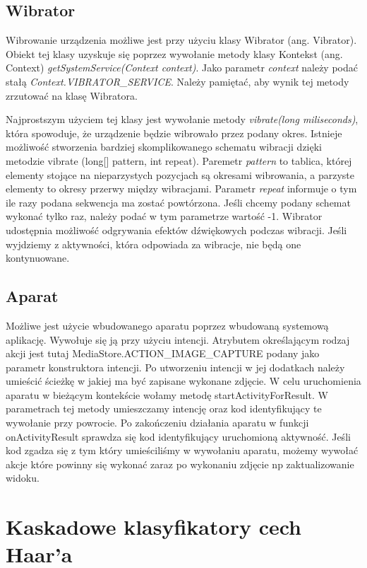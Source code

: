 \documentclass{article}
\let\stdsection\section
\renewcommand\section{\newpage\stdsection}
\numberwithin{equation}{section}
\begin{document}
\subsection{Wibrator}
Wibrowanie urządzenia możliwe jest przy użyciu klasy Wibrator (ang. Vibrator). Obiekt tej klasy uzyskuje się poprzez wywołanie metody klasy Kontekst (ang. Context) \textit{getSystemService(Context context)}. Jako parametr \textit{context} należy podać stałą \textit{Context.VIBRATOR\_SERVICE}. Należy pamiętać, aby wynik tej metody zrzutować na klasę Wibratora.\par Najprostszym użyciem tej klasy jest wywołanie metody \textit{vibrate(long miliseconds)}, która spowoduje, że urządzenie będzie wibrowało przez podany okres. Istnieje możliwość stworzenia bardziej skomplikowanego schematu wibracji dzięki metodzie vibrate (long[] pattern, int repeat). Paremetr \textit{pattern} to tablica, której elementy stojące na nieparzystych pozycjach są okresami wibrowania, a parzyste elementy to okresy przerwy między wibracjami. Parametr \textit{repeat} informuje o tym ile razy podana sekwencja ma zostać powtórzona. Jeśli chcemy podany schemat wykonać tylko raz, należy podać w tym parametrze wartość -1. Wibrator udostępnia możliwość odgrywania efektów dźwiękowych podczas wibracji. Jeśli wyjdziemy z aktywności, która odpowiada za wibracje, nie będą one kontynuowane.\citep{vibrator}
\subsection{Aparat}

Możliwe jest użycie wbudowanego aparatu poprzez wbudowaną systemową aplikację. Wywołuje się ją przy użyciu intencji. Atrybutem określającym rodzaj akcji jest tutaj MediaStore.ACTION\_IMAGE\_CAPTURE podany jako parametr konstruktora intencji. Po utworzeniu intencji w jej dodatkach należy umieścić ścieżkę w jakiej ma być zapisane wykonane zdjęcie. W celu uruchomienia aparatu w bieżącym kontekście wołamy metodę startActivityForResult. W parametrach tej metody umieszczamy intencję oraz kod identyfikujący te wywołanie przy powrocie. Po zakończeniu działania aparatu w funkcji onActivityResult sprawdza się kod identyfikujący uruchomioną aktywność. Jeśli kod zgadza się z tym który umieściliśmy w wywołaniu aparatu, możemy wywołać akcje które powinny się wykonać zaraz po wykonaniu zdjęcie np zaktualizowanie widoku.



\section{Kaskadowe klasyfikatory cech Haar'a}
\end{document}
